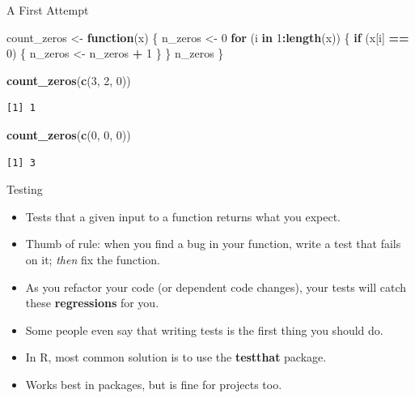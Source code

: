\documentclass[
  ignorenonframetext,
  aspectratio=1610,
  onlytextwidth]{beamer}
\newenvironment{Shaded}{\begin{snugshade}}{\end{snugshade}}
\newcommand{\ControlFlowTok}[1]{\textcolor[rgb]{0.13,0.29,0.53}{\textbf{#1}}}
\newcommand{\DecValTok}[1]{\textcolor[rgb]{0.00,0.00,0.81}{#1}}
\newcommand{\FunctionTok}[1]{\textcolor[rgb]{0.13,0.29,0.53}{\textbf{#1}}}
\newcommand{\NormalTok}[1]{#1}
\newcommand{\OtherTok}[1]{\textcolor[rgb]{0.56,0.35,0.01}{#1}}
\newcommand{\SpecialCharTok}[1]{\textcolor[rgb]{0.81,0.36,0.00}{\textbf{#1}}}
\providecommand{\tightlist}{}
\begin{document}
\begin{frame}[fragile]{A First Attempt}
\label{a-first-attempt}
\begin{Shaded}
\begin{Highlighting}[]
\NormalTok{count\_zeros }\OtherTok{\textless{}{-}} \ControlFlowTok{function}\NormalTok{(x) \{}
\NormalTok{  n\_zeros }\OtherTok{\textless{}{-}} \DecValTok{0}
  \ControlFlowTok{for}\NormalTok{ (i }\ControlFlowTok{in} \DecValTok{1}\SpecialCharTok{:}\FunctionTok{length}\NormalTok{(x)) \{}
    \ControlFlowTok{if}\NormalTok{ (x[i] }\SpecialCharTok{==} \DecValTok{0}\NormalTok{) \{}
\NormalTok{      n\_zeros }\OtherTok{\textless{}{-}}\NormalTok{ n\_zeros }\SpecialCharTok{+} \DecValTok{1}
\NormalTok{    \}}
\NormalTok{  \}}
\NormalTok{  n\_zeros}
\NormalTok{\}}
\end{Highlighting}
\end{Shaded}

\pause

\begin{Shaded}
\begin{Highlighting}[]
\FunctionTok{count\_zeros}\NormalTok{(}\FunctionTok{c}\NormalTok{(}\DecValTok{3}\NormalTok{, }\DecValTok{2}\NormalTok{, }\DecValTok{0}\NormalTok{))}
\end{Highlighting}
\end{Shaded}

\begin{verbatim}
[1] 1
\end{verbatim}

\begin{Shaded}
\begin{Highlighting}[]
\FunctionTok{count\_zeros}\NormalTok{(}\FunctionTok{c}\NormalTok{(}\DecValTok{0}\NormalTok{, }\DecValTok{0}\NormalTok{, }\DecValTok{0}\NormalTok{))}
\end{Highlighting}
\end{Shaded}

\begin{verbatim}
[1] 3
\end{verbatim}
\end{frame}

\begin{frame}{Testing}
\label{testing}
\begin{itemize}[<+->]
\tightlist
\item
  Tests that a given input to a function returns what you expect.
\item
  Thumb of rule: when you find a bug in your function, write a test that
  fails on it; \emph{then} fix the function.
\item
  As you refactor your code (or dependent code changes), your tests will
  catch these \textbf{regressions} for you.
\item
  Some people even say that writing tests is the first thing you should
  do.
\item
  In R, most common solution is to use the \textbf{testthat} package.
\item
  Works best in packages, but is fine for projects too.
\end{itemize}
\end{frame}
\end{document}
